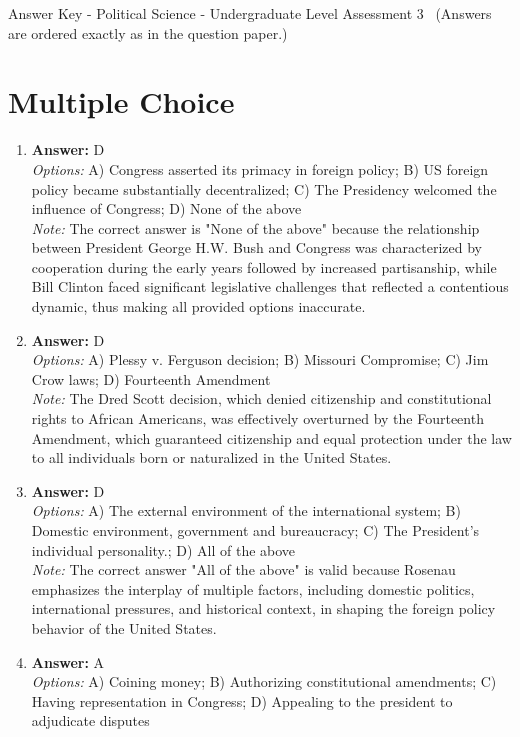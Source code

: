\documentclass[12pt]{article}
\begin{document}
\begin{center}
Answer Key - Political Science - Undergraduate Level Assessment 3 \
\small (Answers are ordered exactly as in the question paper.)
\end{center}

\section*{Multiple Choice}
\begin{enumerate}[label=\arabic*.]
\item \textbf{Answer:} D
\\ \textit{Options:} A) Congress asserted its primacy in foreign policy; B) US foreign policy became substantially decentralized; C) The Presidency welcomed the influence of Congress; D) None of the above
\\ \textit{Note:} The correct answer is "None of the above" because the relationship between President George H.W. Bush and Congress was characterized by cooperation during the early years followed by increased partisanship, while Bill Clinton faced significant legislative challenges that reflected a contentious dynamic, thus making all provided options inaccurate.
\item \textbf{Answer:} D
\\ \textit{Options:} A) Plessy v. Ferguson decision; B) Missouri Compromise; C) Jim Crow laws; D) Fourteenth Amendment
\\ \textit{Note:} The Dred Scott decision, which denied citizenship and constitutional rights to African Americans, was effectively overturned by the Fourteenth Amendment, which guaranteed citizenship and equal protection under the law to all individuals born or naturalized in the United States.
\item \textbf{Answer:} D
\\ \textit{Options:} A) The external environment of the international system; B) Domestic environment, government and bureaucracy; C) The President's individual personality.; D) All of the above
\\ \textit{Note:} The correct answer "All of the above" is valid because Rosenau emphasizes the interplay of multiple factors, including domestic politics, international pressures, and historical context, in shaping the foreign policy behavior of the United States.
\item \textbf{Answer:} A
\\ \textit{Options:} A) Coining money; B) Authorizing constitutional amendments; C) Having representation in Congress; D) Appealing to the president to adjudicate disputes

\end{enumerate}
\end{document}
